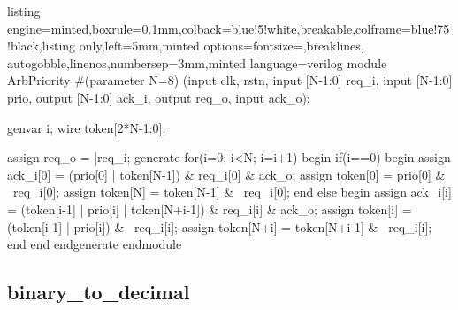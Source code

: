 \documentclass[a4paper]{article}
\begin{document}
\begin{tcblisting}{listing engine=minted,boxrule=0.1mm,colback=blue!5!white,breakable,colframe=blue!75!black,listing only,left=5mm,minted options={fontsize=\small,breaklines, autogobble,linenos,numbersep=3mm},minted language=verilog}
module ArbPriority
    #(parameter N=8)
     (input clk, rstn,
     input [N-1:0] req_i,
     input [N-1:0] prio,
     output [N-1:0] ack_i,
     output req_o,
     input ack_o);

    genvar i;
    wire token[2*N-1:0];


    assign req_o = |req_i;
    generate for(i=0; i<N; i=i+1) begin
      if(i==0) begin
        assign ack_i[0] = (prio[0] | token[N-1]) & req_i[0] & ack_o;
        assign token[0] = prio[0] & ~req_i[0];
        assign token[N] = token[N-1] & ~req_i[0];
      end else begin
        assign ack_i[i] = (token[i-1] | prio[i] | token[N+i-1]) & req_i[i] & ack_o;
        assign token[i] = (token[i-1] | prio[i]) & ~req_i[i];
        assign token[N+i] = token[N+i-1] & ~req_i[i];
      end
    end endgenerate
endmodule
\end{tcblisting}

\subsection*{binary\_to\_decimal}



\end{document}
